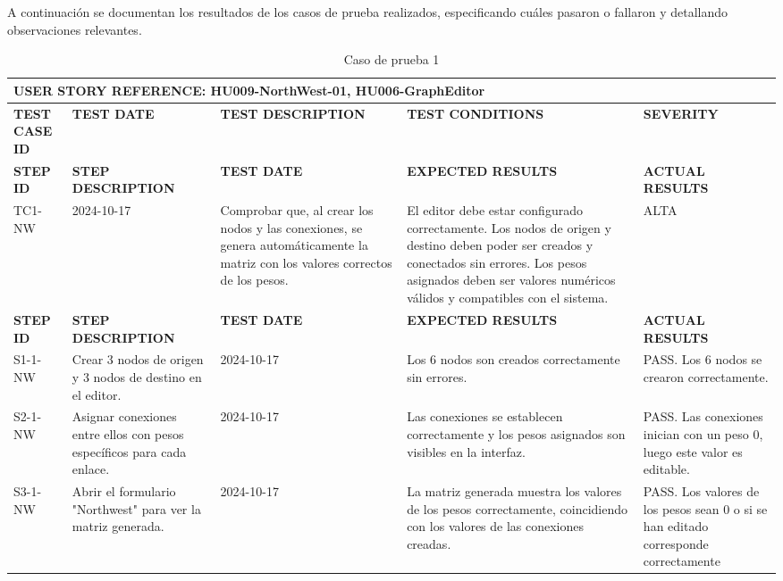 \documentclass[stu, 12pt, letterpaper, donotrepeattitle, floatsintext, natbib]{apa7}
\begin{document}
\noindent A continuación se documentan los resultados de los casos de prueba realizados, especificando cuáles pasaron o fallaron y detallando observaciones relevantes.

\small %
\renewcommand{\arraystretch}{1.0} %
\setlength{\tabcolsep}{4pt} %

\begin{longtable}{|p{2cm}|p{3cm}|p{3cm}|p{3cm}|p{3cm}|}
  \caption{Caso de prueba 1} \label{tab:casos_prueba1} \\
  \hline
    \multicolumn{5}{|l|}{\textbf{USER STORY REFERENCE: HU009-NorthWest-01, HU006-GraphEditor}} \\ \hline

  \textbf{TEST CASE ID} & \textbf{TEST DATE} & \textbf{TEST DESCRIPTION} & \textbf{TEST CONDITIONS} & \textbf{SEVERITY} \\ \hline
  \endfirsthead
  \hline
  \textbf{STEP ID} & \textbf{STEP DESCRIPTION} & \textbf{TEST DATE} & \textbf{EXPECTED RESULTS} & \textbf{ACTUAL RESULTS} \\ \hline
  \endhead
  TC1-NW & 2024-10-17 & Comprobar que, al crear los nodos y las conexiones, se genera automáticamente la matriz con los valores correctos de los pesos. & El editor debe estar configurado correctamente. Los nodos de origen y destino deben poder ser creados y conectados sin errores. Los pesos asignados deben ser valores numéricos válidos y compatibles con el sistema. & ALTA \\ \hline
\textbf{STEP ID} & \textbf{STEP DESCRIPTION} & \textbf{TEST DATE} & \textbf{EXPECTED RESULTS} & \textbf{ACTUAL RESULTS} \\ \hline
S1-1-NW & Crear 3 nodos de origen y 3 nodos de destino en el editor. & 2024-10-17 & Los 6 nodos son creados correctamente sin errores. & PASS. Los 6 nodos se crearon correctamente. \\ \hline
S2-1-NW & Asignar conexiones entre ellos con pesos específicos para cada enlace. & 2024-10-17 & Las conexiones se establecen correctamente y los pesos asignados son visibles en la interfaz. & PASS. Las conexiones inician con un peso 0, luego este valor es editable. \\ \hline
S3-1-NW & Abrir el formulario "Northwest" para ver la matriz generada. & 2024-10-17 & La matriz generada muestra los valores de los pesos correctamente, coincidiendo con los valores de las conexiones creadas. & PASS. Los valores de los pesos sean 0 o si se han editado corresponde correctamente \\ \hline
\end{longtable}
\end{document}
